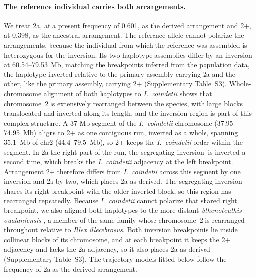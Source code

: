 \documentclass[11pt]{article}
\newcommand{\illex}{\textit{Illex illecebrosus}}
\newcommand{\coin}{\textit{I.\ coindetii}}
\begin{document}
\paragraph{The reference individual carries both arrangements.} We treat 2a, at a present frequency of 0.601, as the derived arrangement and 2+, at 0.398, as the ancestral arrangement. The reference allele cannot
polarize the arrangements, because the individual from which the reference was assembled is heterozygous for the
inversion. Its two haplotype assemblies differ by an inversion at 60.54--79.53~Mb, matching the breakpoints inferred from the
population data, the haplotype inverted relative to the primary assembly carrying 2a and the other, like the
primary assembly, carrying 2+ (Supplementary Table~S3). Whole-chromosome alignment of both haplotypes to \coin{} shows that chromosome~2 is extensively rearranged
between the species, with large blocks translocated and inverted along its length, and the inversion region is
part of this complex structure. A 37-Mb segment of the \coin{} chromosome (37.95--74.95~Mb) aligns to 2+ as one contiguous run, inverted as a whole, spanning 35.1~Mb of chr2 (44.4--79.5~Mb), so 2+ keeps the \coin{} order within the segment. In 2a the
right part of the run, the segregating inversion, is inverted a second time, which breaks the \coin{} adjacency
at the left breakpoint. Arrangement 2+ therefore differs from \coin{} across this segment by one inversion and 2a by two,
which places 2a as derived. The segregating inversion shares its right breakpoint with the older inverted block,
so this region has rearranged repeatedly. Because \coin{} cannot polarize that shared right breakpoint, we also aligned both haplotypes to the more distant \textit{Sthenoteuthis oualaniensis} \citep{li2022flyingsquid}, a member of the same family whose chromosome~2 is rearranged throughout relative to \illex{}. Both inversion breakpoints lie inside collinear blocks of its chromosome, and at each breakpoint it keeps the 2+ adjacency and lacks the 2a adjacency, so it also places 2a as derived (Supplementary Table~S3). The trajectory models fitted below follow the frequency of 2a as the derived arrangement.
\end{document}
